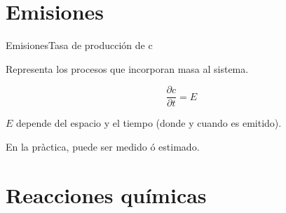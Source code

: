 %
%

\section{Emisiones}
\begin{frame}{Emisiones}{Tasa de producción de c}

Representa los procesos que incorporan masa al sistema.
\begin{center}
    \EmisPict
\end{center}

\pause
$$\boxed{\dfrac{\partial c}{\partial t}=E\,}$$

$E$ depende del espacio y el tiempo (donde y cuando es emitido). 

En la pràctica, puede ser medido ó estimado.
\end{frame}


\section{Reacciones químicas}
 
